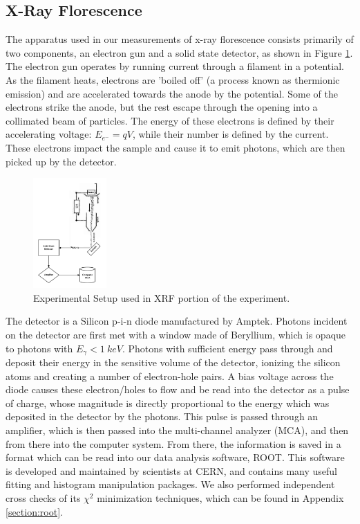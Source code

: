 \documentclass[%
 reprint,
 amsmath,amssymb,
 aps,
 pra,
]{revtex4-1}
\begin{document}
\subsection{X-Ray Florescence}

The apparatus used in our measurements of x-ray florescence consists primarily of two components, an electron gun and a solid state detector, as shown in Figure \ref{fig:xrf_setup}. The electron gun operates by running current through a filament in a potential. As the filament heats, electrons are 'boiled off' (a process known as thermionic emission) and are accelerated towards the anode by the potential. Some of the electrons strike the anode, but the rest escape through the opening into a collimated beam of particles. The energy of these electrons is defined by their accelerating voltage: $E_{e^-} = qV$, while their number is defined by the current. These electrons impact the sample and cause it to emit photons, which are then picked up by the detector. 

\begin{figure}[H]
	\centering
	\includegraphics[width=0.25\textwidth]{xrf_experiment.png}
	\caption{Experimental Setup used in XRF portion of the experiment.}
	\label{fig:xrf_setup}
\end{figure}

The detector is a Silicon p-i-n diode manufactured by Amptek. Photons incident on the detector are first met with a window made of Beryllium, which is opaque to photons with $E_\gamma <1~keV$. Photons with sufficient energy pass through and deposit their energy in the sensitive volume of the detector, ionizing the silicon atoms and creating a number of electron-hole pairs. A bias voltage across the diode causes these electron/holes to flow and be read into the detector as a pulse of charge, whose magnitude is directly proportional to the energy which was deposited in the detector by the photons. This pulse is passed through an amplifier, which is then passed into the multi-channel analyzer (MCA), and then from there into the computer system. From there, the information is saved in a format which can be read into our data analysis software, ROOT. This software is developed and maintained by scientists at CERN, and contains many useful fitting and histogram manipulation packages. We also performed independent cross checks of its $\chi^2$ minimization techniques, which can be found in Appendix \ref{section:root}.
\end{document}
